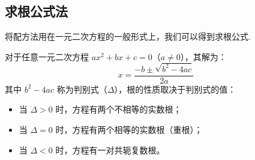 \documentclass[lang=cn, 10pt, titlestyle=hang, oneside]{elegantbook}
\begin{document}
\subsection{求根公式法}



将配方法用在一元二次方程的一般形式上，我们可以得到求根公式.
\begin{theorem}[一元二次方程求根公式]
对于任意一元二次方程 $ax^2 + bx + c = 0$（$a \neq 0$），其解为：
\[
x = \frac{-b \pm \sqrt{b^2 - 4ac}}{2a}
\]
其中 $b^2 - 4ac$ 称为判别式（$\Delta$），根的性质取决于判别式的值：
\begin{itemize}
    \item 当 $\Delta > 0$ 时，方程有两个不相等的实数根；
    \item 当 $\Delta = 0$ 时，方程有两个相等的实数根（重根）；
    \item 当 $\Delta < 0$ 时，方程有一对共轭复数根。
\end{itemize}
\end{theorem}
\end{document}
